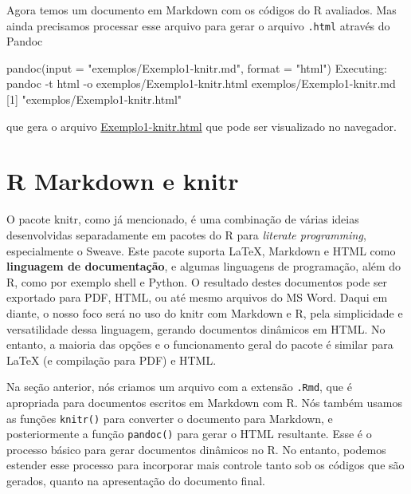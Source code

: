 \documentclass[
  10pt,
  a4paper]{book}
\newenvironment{Shaded}{\begin{snugshade}}{\end{snugshade}}
\newcommand{\AttributeTok}[1]{\textcolor[rgb]{0.77,0.63,0.00}{#1}}
\newcommand{\DecValTok}[1]{\textcolor[rgb]{0.00,0.00,0.81}{#1}}
\newcommand{\FunctionTok}[1]{\textcolor[rgb]{0.00,0.00,0.00}{#1}}
\newcommand{\NormalTok}[1]{#1}
\newcommand{\SpecialCharTok}[1]{\textcolor[rgb]{0.00,0.00,0.00}{#1}}
\newcommand{\StringTok}[1]{\textcolor[rgb]{0.31,0.60,0.02}{#1}}
\begin{document}
Agora temos um documento em Markdown com os códigos do R avaliados. Mas
ainda precisamos processar esse arquivo para gerar o arquivo \texttt{.html}
através do Pandoc

\begin{Shaded}
\begin{Highlighting}[]
\FunctionTok{pandoc}\NormalTok{(}\AttributeTok{input =} \StringTok{"exemplos/Exemplo1{-}knitr.md"}\NormalTok{, }\AttributeTok{format =} \StringTok{"html"}\NormalTok{)}
\NormalTok{Executing}\SpecialCharTok{:}\NormalTok{ pandoc }\SpecialCharTok{{-}}\NormalTok{t html }\SpecialCharTok{{-}}\NormalTok{o }\StringTok{\textquotesingle{}exemplos/Exemplo1{-}knitr.html\textquotesingle{}} \StringTok{\textquotesingle{}exemplos/Exemplo1{-}knitr.md\textquotesingle{}}
\NormalTok{[}\DecValTok{1}\NormalTok{] }\StringTok{"exemplos/Exemplo1{-}knitr.html"}
\end{Highlighting}
\end{Shaded}

que gera o arquivo
\href{exemplos/Exemplo1-knitr.html}{Exemplo1-knitr.html} que pode
ser visualizado no navegador.

\hypertarget{r-markdown-e-knitr}{%
\section{R Markdown e knitr}\label{r-markdown-e-knitr}}

O pacote knitr, como já mencionado, é uma combinação de várias ideias
desenvolvidas separadamente em pacotes do R para \emph{literate programming},
especialmente o Sweave. Este pacote suporta LaTeX, Markdown e HTML
como \textbf{linguagem de documentação}, e algumas linguagens de programação,
além do R, como por exemplo shell e Python. O resultado destes
documentos pode ser exportado para PDF, HTML, ou até mesmo arquivos do
MS Word. Daqui em diante, o nosso foco será no uso do knitr com Markdown
e R, pela simplicidade e versatilidade dessa linguagem, gerando
documentos dinâmicos em HTML. No entanto, a maioria das opções e o
funcionamento geral do pacote é similar para LaTeX (e compilação para
PDF) e HTML.

Na seção anterior, nós criamos um arquivo com a extensão \texttt{.Rmd}, que é
apropriada para documentos escritos em Markdown com R. Nós também usamos
as funções \texttt{knitr()} para converter o documento para Markdown, e
posteriormente a função \texttt{pandoc()} para gerar o HTML resultante.
Esse é o processo básico para gerar documentos dinâmicos no R. No
entanto, podemos estender esse processo para incorporar mais controle
tanto sob os códigos que são gerados, quanto na apresentação do
documento final.
\end{document}

